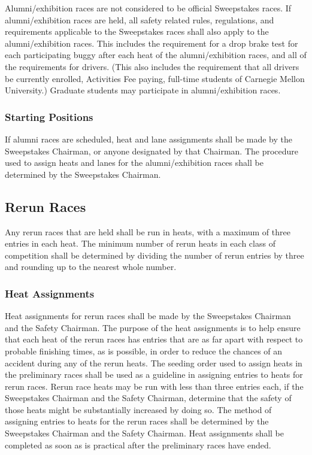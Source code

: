 	Alumni/exhibition races are not considered to be official Sweepstakes races. If
	alumni/exhibition races are held, all safety related rules, regulations, and
	requirements applicable to the Sweepstakes races shall also apply to the
	alumni/exhibition races. This includes the requirement for a drop brake test
	for each participating buggy after each heat of the alumni/exhibition races,
	and all of the requirements for drivers. (This also includes the requirement
	that all drivers be currently enrolled, Activities Fee paying, full-time
	students of Carnegie Mellon University.) Graduate students may participate in
	alumni/exhibition races.

\subsubsection{Starting Positions}

	If alumni races are scheduled, heat and lane assignments shall be made by the
	Sweepstakes Chairman, or anyone designated by that Chairman. The procedure used
	to assign heats and lanes for the alumni/exhibition races shall be determined
	by the Sweepstakes Chairman.

\subsection{Rerun Races}
	
	Any rerun races that are held shall be run in heats, with a maximum of three
	entries in each heat. The minimum number of rerun heats in each class of
	competition shall be determined by dividing the number of rerun entries by
	three and rounding up to the nearest whole number.

\subsubsection{Heat Assignments}

	Heat assignments for rerun races shall be made by the Sweepstakes Chairman and
	the Safety Chairman. The purpose of the heat assignments is to help ensure that
	each heat of the rerun races has entries that are as far apart with respect to
	probable finishing times, as is possible, in order to reduce the chances of an
	accident during any of the rerun heats. The seeding order used to assign heats
	in the preliminary races shall be used as a guideline in assigning entries to
	heats for rerun races. Rerun race heats may be run with less than three entries
	each, if the Sweepstakes Chairman and the Safety Chairman, determine that the
	safety of those heats might be substantially increased by doing so. The method
	of assigning entries to heats for the rerun races shall be determined by the
	Sweepstakes Chairman and the Safety Chairman. Heat assignments shall be
	completed as soon as is practical after the preliminary races have ended.

